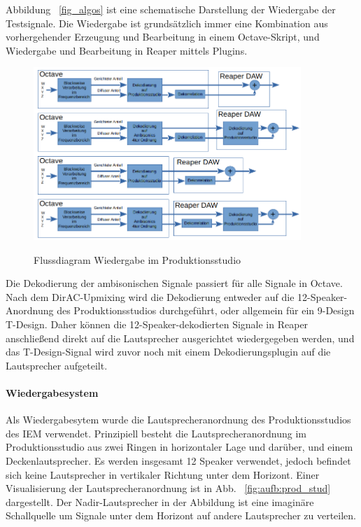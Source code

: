 Abbildung ~\ref{fig_algos} ist eine schematische Darstellung der Wiedergabe der Testsignale. Die Wiedergabe ist grundsätzlich immer eine Kombination aus vorhergehender Erzeugung und Bearbeitung in einem Octave-Skript, und Wiedergabe und Bearbeitung in Reaper mittels Plugins.

\begin{figure}[!ht]
  \centering
  \includegraphics[width=0.9\textwidth]{aufbau/plots/algos.png}
  \label{fig:algos}
  \caption{Flussdiagram Wiedergabe im Produktionsstudio}
\end{figure}

Die Dekodierung der ambisonischen Signale passiert für alle Signale in Octave. Nach dem DirAC-Upmixing wird die Dekodierung entweder auf die 12-Speaker-Anordnung des Produktionsstudios durchgeführt, oder allgemein für ein 9-Design T-Design. Daher können die 12-Speaker-dekodierten Signale in Reaper anschließend direkt auf die Lautsprecher ausgerichtet wiedergegeben werden, und das T-Design-Signal wird zuvor noch mit einem Dekodierungsplugin auf die Lautsprecher aufgeteilt.

\paragraph{Wiedergabesystem}
Als Wiedergabesytem wurde die Lautsprecheranordnung des Produktionsstudios des IEM verwendet. Prinzipiell besteht die Lautsprecheranordnung im Produktionsstudio aus zwei Ringen in horizontaler Lage und darüber, und einem Deckenlautsprecher. Es werden insgesamt 12 Speaker verwendet, jedoch befindet sich keine Lautsprecher in vertikaler Richtung unter dem Horizont. Einer Visualisierung der Lautsprecheranordnung ist in Abb. ~\ref{fig:aufb:prod_stud} dargestellt. Der Nadir-Lautsprecher in der Abbildung ist eine imaginäre Schallquelle um Signale unter dem Horizont auf andere Lautsprecher zu verteilen.

